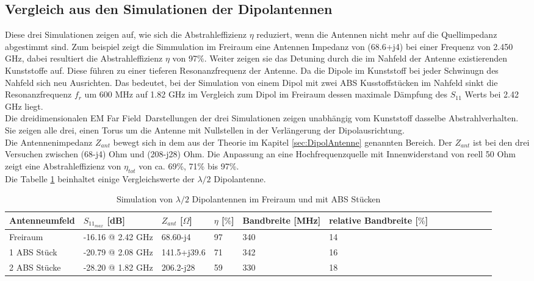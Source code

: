 \subsection{Vergleich aus den Simulationen der Dipolantennen}
Diese drei Simulationen zeigen auf, wie sich die Abstrahleffizienz $\eta$ reduziert, wenn die Antennen nicht mehr auf die Quellimpedanz abgestimmt sind. Zum beispiel zeigt die Simmulation im Freiraum eine Antennen Impedanz von (68.6+j4) bei einer Frequenz von 2.450 GHz, dabei resultiert die Abstrahleffizienz $\eta$ von 97$\%$. Weiter zeigen sie das Detuning durch die im Nahfeld der Antenne existierenden Kunststoffe auf. Diese führen zu einer tieferen Resonanzfrequenz der Antenne. Da die Dipole im Kunststoff bei jeder Schwinugn des Nahfeld sich neu Ausrichten. Das bedeutet, bei der Simulation von einem Dipol mit zwei ABS Kusstoffstücken im Nahfeld sinkt die Resonanzfrequenz $f_{r}$ um 600 MHz auf 1.82 GHz im Vergleich zum Dipol im Freiraum dessen maximale Dämpfung des $S_{11}$ Werts bei 2.42 GHz liegt.\\ 
Die dreidimensionalen \glqq EM Far Field\grqq \ Darstellungen der drei Simulationen zeigen unabhängig vom Kunststoff dasselbe Abstrahlverhalten. Sie zeigen alle drei, einen Torus um die Antenne mit Nullstellen in der Verlängerung der Dipolausrichtung.\\
Die Antennenimpedanz $Z_{ant}$ bewegt sich in dem aus der Theorie im Kapitel \ref{sec:DipolAntenne} genannten Bereich. Der $Z_{ant}$ ist bei den drei Versuchen zwischen (68-j4) Ohm und (208-j28) Ohm. Die Anpassung an eine Hochfrequenzquelle mit Innenwiderstand von reell 50 Ohm zeigt eine Abstrahleffizienz von $\eta_{tot}$ von ca. 69\%, 71\% bis 97\%.\\
Die Tabelle \ref{tab:Evaluation_Vergeich_Dipolantennen} beinhaltet einige Vergleichswerte der $\lambda/2$ Dipolantenne.
\begin{table}[!h]
 \centering
 \begin{tabular}{p{3cm} p{4cm} p{2cm} p{1.5cm} p{2cm} p{2.5cm} l c c c c p r} 
 \toprule 
 Antenneumfeld & $S_{11_{max}}$ [dB]		& $Z_{ant}$ [$\Omega$] 	& $\eta$ [$\%$] & Bandbreite [MHz] & relative Bandbreite [$\%$]\\ 
 \midrule
 Freiraum 			&	-16.16 @ 2.42 GHz		& 	68.60-j4			& 	97	&	340 & 14\\ 		
1 ABS Stück 	& -20.79 @ 2.08 GHz 		&	141.5+j39.6		&	71	&	342	 & 16 \\
2 ABS Stücke 	& -28.20 @ 1.82 GHz 	&	206.2-j28		&	59	&	330	 & 18 \\
 \bottomrule
 \end{tabular}
 \caption{Simulation von $\lambda/2$ Dipolantennen im Freiraum und mit ABS Stücken}
 \label{tab:Evaluation_Vergeich_Dipolantennen}
\end{table}

